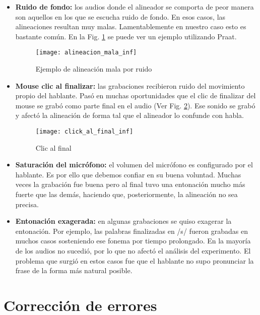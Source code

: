\begin{itemize}
    \item \textbf{Ruido de fondo:} los audios donde el alineador se comporta de peor manera son aquellos en los que se escucha ruido de fondo. En esos casos, las alineaciones resultan muy malas. Lamentablemente en nuestro caso esto es bastante común. En la Fig. \ref{alinMala} se puede ver un ejemplo utilizando Praat.

\begin{figure}[h!]
    \centerline{\texttt{[image: alineacion\_mala\_inf]} }
    \caption{Ejemplo de alineación mala por ruido}
    \label{alinMala}
\end{figure}

    \item \textbf{Mouse clic al finalizar:} las grabaciones recibieron ruido del movimiento propio del hablante. Pasó en muchas oportunidades que el clic de finalizar del mouse se grabó como parte final en el audio (Ver Fig. \ref{clickFinal}). Ese sonido se grabó y afectó la alineación de forma tal que el alineador lo confunde con habla.
    
\begin{figure}[h!]
    \centerline{\texttt{[image: click\_al\_final\_inf]} }
    \caption{Clic al final}
    \label{clickFinal}
\end{figure}

    \item \textbf{Saturación del micrófono:} el volumen del micrófono es configurado por el hablante. Es por ello que debemos confiar en su buena voluntad. Muchas veces la grabación fue buena pero al final tuvo una entonación mucho más fuerte que las demás, haciendo que, posteriormente, la alineación no sea precisa.

    \item \textbf{Entonación exagerada:} en algunas grabaciones se quiso exagerar la entonación. Por ejemplo, las palabras finalizadas en /s/ fueron grabadas en muchos casos sosteniendo ese fonema por tiempo prolongado. En la mayoría de los audios no sucedió, por lo que no afectó el análisis del experimento. El problema que surgió en estos casos fue que el hablante no supo pronunciar la frase de la forma más natural posible. 
    
\end{itemize}

\section{Corrección de errores}

